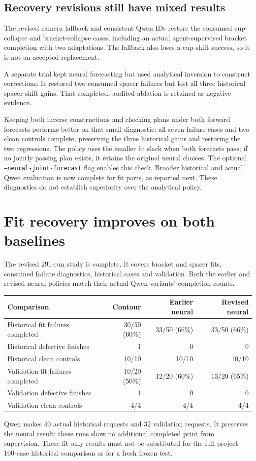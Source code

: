 \documentclass[10pt,letterpaper]{article}
\begin{document}
\subsection*{Recovery revisions still have mixed results}
The revised camera fallback and consistent Qwen IDs restore the consumed
cup-collapse and bracket-collapse cases, including an actual agent-supervised
bracket completion with two adaptations. The fallback also loses a cup-shift
success, so it is not an accepted replacement.

A separate trial kept neural forecasting but used analytical inversion to
construct corrections. It restored two consumed spacer failures but lost all
three historical spacer-shift gains. That completed, audited ablation is retained
as negative evidence.

Keeping both inverse constructions and checking plans under both forward
forecasts performs better on that small diagnostic: all seven failure cases and
two clean controls complete, preserving the three historical gains and restoring
the two regressions. The policy uses the smaller fit slack when both forecasts
pass; if no jointly passing plan exists, it retains the original neural choices.
The optional \texttt{--neural-joint-forecast} flag enables this check. Broader
historical and actual Qwen evaluation is now complete for fit parts, as reported
next. These diagnostics do not establish superiority over the analytical policy.

\clearpage
\section{Fit recovery improves on both baselines}

The revised 291-run study is complete. It covers bracket and spacer fits,
consumed failure diagnostics, historical cases and validation. Both the earlier
and revised neural policies match their actual-Qwen variants' completion counts.

\begin{center}
\begin{tabularx}{\linewidth}{@{}Yrrr@{}}
\toprule
Comparison & Contour & Earlier neural & Revised neural\\
\midrule
Historical fit failures completed & 30/50 (60\%) & 33/50 (66\%) & 33/50 (66\%)\\
Historical defective finishes & 1 & 0 & 0\\
Historical clean controls & 10/10 & 10/10 & 10/10\\
Validation fit failures completed & 10/20 (50\%) & 12/20 (60\%) & 13/20 (65\%)\\
Validation defective finishes & 1 & 0 & 0\\
Validation clean controls & 4/4 & 4/4 & 4/4\\
\bottomrule
\end{tabularx}
\end{center}
Qwen makes 40 actual historical requests and 32 validation requests. It preserves
the neural result; these runs show no additional completed print from supervision.
These fit-only results must not be substituted for the full-project 100-case
historical comparison or for a fresh frozen test.
\end{document}
